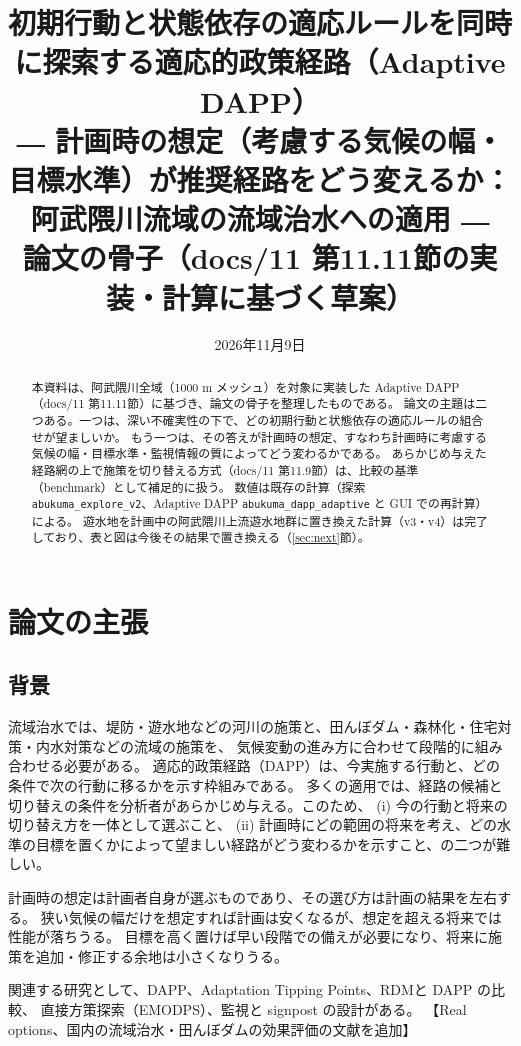\documentclass[a4paper,10pt]{ltjsarticle}
\title{初期行動と状態依存の適応ルールを同時に探索する適応的政策経路（Adaptive DAPP）\\[2pt]
\large ― 計画時の想定（考慮する気候の幅・目標水準）が推奨経路をどう変えるか：阿武隈川流域の流域治水への適用 ―\\[6pt]
\normalsize 論文の骨子（docs/11 第11.11節の実装・計算に基づく草案）}
\author{}
\date{2026年11月9日}
\newcommand{\todo}[1]{\textcolor{corange}{【#1】}}
\begin{document}
\maketitle

\begin{abstract}
本資料は、阿武隈川全域（1000 m メッシュ）を対象に実装した Adaptive DAPP（docs/11 第11.11節）に基づき、論文の骨子を整理したものである。
論文の主題は二つある。一つは、深い不確実性の下で、どの初期行動と状態依存の適応ルールの組合せが望ましいか。
もう一つは、その答えが計画時の想定、すなわち計画時に考慮する気候の幅・目標水準・監視情報の質によってどう変わるかである。
あらかじめ与えた経路網の上で施策を切り替える方式（docs/11 第11.9節）は、比較の基準（benchmark）として補足的に扱う。
数値は既存の計算（探索 \texttt{abukuma\_explore\_v2}、Adaptive DAPP \texttt{abukuma\_dapp\_adaptive} と GUI での再計算）による。
遊水地を計画中の阿武隈川上流遊水地群に置き換えた計算（v3・v4）は完了しており、表と図は今後その結果で置き換える（\ref{sec:next}節）。
\end{abstract}

\tableofcontents
\bigskip

\section{論文の主張}
\label{sec:claim}

\subsection{背景}
流域治水では、堤防・遊水地などの河川の施策と、田んぼダム・森林化・住宅対策・内水対策などの流域の施策を、
気候変動の進み方に合わせて段階的に組み合わせる必要がある\cite{mlit_ryuiki,mlit_teigen}。
適応的政策経路（DAPP）\cite{haasnoot2013}は、今実施する行動と、どの条件で次の行動に移るかを示す枠組みである。
多くの適用では、経路の候補と切り替えの条件を分析者があらかじめ与える。このため、
(i) 今の行動と将来の切り替え方を一体として選ぶこと、
(ii) 計画時にどの範囲の将来を考え、どの水準の目標を置くかによって望ましい経路がどう変わるかを示すこと、の二つが難しい。

計画時の想定は計画者自身が選ぶものであり、その選び方は計画の結果を左右する。
狭い気候の幅だけを想定すれば計画は安くなるが、想定を超える将来では性能が落ちうる。
目標を高く置けば早い段階での備えが必要になり、将来に施策を追加・修正する余地は小さくなりうる。

関連する研究として、DAPP\cite{haasnoot2013}、Adaptation Tipping Points\cite{kwadijk2010}、RDM\cite{lempert2003}と DAPP の比較\cite{kwakkel2016}、
直接方策探索（EMODPS）\cite{giuliani2016,quinn2017}、監視と signpost の設計\cite{haasnoot2018,hermans2017}がある。
\todo{Real options、国内の流域治水・田んぼダムの効果評価の文献を追加}
\end{document}
